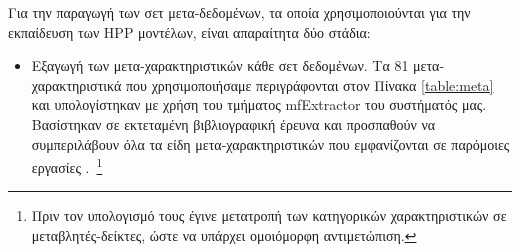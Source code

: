 Για την παραγωγή των σετ μετα-δεδομένων, τα οποία χρησιμοποιούνται για την εκπαίδευση των HPP μοντέλων, είναι απαραίτητα δύο στάδια:
\begin{itemize}
	\item Εξαγωγή των μετα-χαρακτηριστικών κάθε σετ δεδομένων. Τα  81 μετα-χαρακτηριστικά που χρησιμοποιήσαμε περιγράφονται στον Πίνακα \ref{table:meta} και υπολογίστηκαν με χρήση του τμήματος mf\-Extractor του συστήματός μας. Βασίστηκαν σε εκτεταμένη βιβλιογραφική έρευνα και προσπαθούν να συμπεριλάβουν όλα τα είδη μετα-χαρακτηριστικών που εμφανίζονται σε παρόμοιες εργασίες \citep{Brazdil2009,Reif_meta2-features:,Feurer:2014:UMI:3015544.3015549}.~\footnote{Πριν τον υπολογισμό τους έγινε μετατροπή των κατηγορικών χαρακτηριστικών σε μεταβλητές-δείκτες, ώστε να υπάρχει ομοιόμορφη αντιμετώπιση.}   
		\begin{table}[!htb]
			\begin{center}
				\caption{Λίστα μετα-χαρακτηριστικών, τα οποία χρησιμοποιήθηκαν για την εκπαίδευση των HPP μοντέλων}
				\label{table:meta}
\end{center}
\end{table}
\end{itemize}
